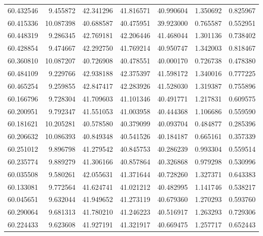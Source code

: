 \begin{tabular}{rrrrrrr}
 60.432546 &   9.455872 &         42.341296 &         41.816571 &         40.990604 &  1.350692 &  0.825967 \\
 60.415336 &  10.087398 &         40.688587 &         40.475951 &         39.923000 &  0.765587 &  0.552951 \\
 60.448319 &   9.286345 &         42.769181 &         42.206446 &         41.468044 &  1.301136 &  0.738402 \\
 60.428854 &   9.474667 &         42.292750 &         41.769214 &         40.950747 &  1.342003 &  0.818467 \\
 60.360810 &  10.087207 &         40.726908 &         40.478551 &         40.000170 &  0.726738 &  0.478380 \\
 60.484109 &   9.229766 &         42.938188 &         42.375397 &         41.598172 &  1.340016 &  0.777225 \\
 60.465254 &   9.259855 &         42.847417 &         42.283926 &         41.528030 &  1.319387 &  0.755896 \\
 60.166796 &   9.728304 &         41.709603 &         41.101346 &         40.491771 &  1.217831 &  0.609575 \\
 60.200951 &   9.792347 &         41.551053 &         41.003958 &         40.444368 &  1.106686 &  0.559590 \\
 60.181621 &  10.205281 &         40.578580 &         40.379099 &         40.093704 &  0.484877 &  0.285396 \\
 60.206632 &  10.086393 &         40.849348 &         40.541526 &         40.184187 &  0.665161 &  0.357339 \\
 60.251012 &   9.896798 &         41.279542 &         40.845753 &         40.286239 &  0.993304 &  0.559514 \\
 60.235774 &   9.889279 &         41.306166 &         40.857864 &         40.326868 &  0.979298 &  0.530996 \\
 60.035508 &   9.580261 &         42.055631 &         41.371644 &         40.728260 &  1.327371 &  0.643383 \\
 60.133081 &   9.772564 &         41.624741 &         41.021212 &         40.482995 &  1.141746 &  0.538217 \\
 60.045651 &   9.632044 &         41.949652 &         41.273119 &         40.679360 &  1.270293 &  0.593760 \\
 60.290064 &   9.681313 &         41.780210 &         41.246223 &         40.516917 &  1.263293 &  0.729306 \\
 60.224433 &   9.623608 &         41.927191 &         41.321917 &         40.669475 &  1.257717 &  0.652443 \\

\end{tabular}
